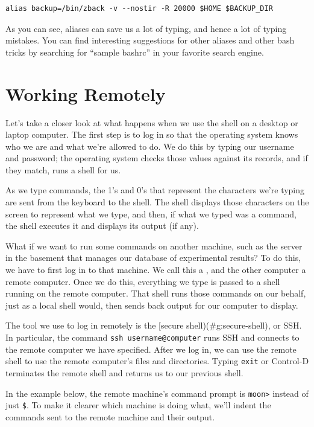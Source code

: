 \documentclass{book}
\begin{document}
\begin{verbatim}
alias backup=/bin/zback -v --nostir -R 20000 $HOME $BACKUP_DIR
\end{verbatim}

As you can see, aliases can save us a lot of typing, and hence a lot of
typing mistakes. You can find interesting suggestions for other aliases
and other bash tricks by searching for ``sample bashrc'' in your
favorite search engine.

\section{Working Remotely}

Let's take a closer look at what happens when we use the shell on a
desktop or laptop computer. The first step is to log in so that the
operating system knows who we are and what we're allowed to do. We do
this by typing our username and password; the operating system checks
those values against its records, and if they match, runs a shell for
us.

As we type commands, the 1's and 0's that represent the characters we're
typing are sent from the keyboard to the shell. The shell displays those
characters on the screen to represent what we type, and then, if what we
typed was a command, the shell executes it and displays its output (if
any).

What if we want to run some commands on another machine, such as the
server in the basement that manages our database of experimental
results? To do this, we have to first log in to that machine. We call
this a , and the other computer a
remote computer. Once we do this, everything we type is passed to a
shell running on the remote computer. That shell runs those commands on
our behalf, just as a local shell would, then sends back output for our
computer to display.

The tool we use to log in remotely is the {[}secure
shell)(\#g:secure-shell), or SSH. In particular, the command
\texttt{ssh username@computer} runs SSH and connects to the remote
computer we have specified. After we log in, we can use the remote shell
to use the remote computer's files and directories. Typing \texttt{exit}
or Control-D terminates the remote shell and returns us to our previous
shell.

In the example below, the remote machine's command prompt is
\texttt{moon\textgreater{}} instead of just \texttt{\$}. To make it
clearer which machine is doing what, we'll indent the commands sent to
the remote machine and their output.
\end{document}
